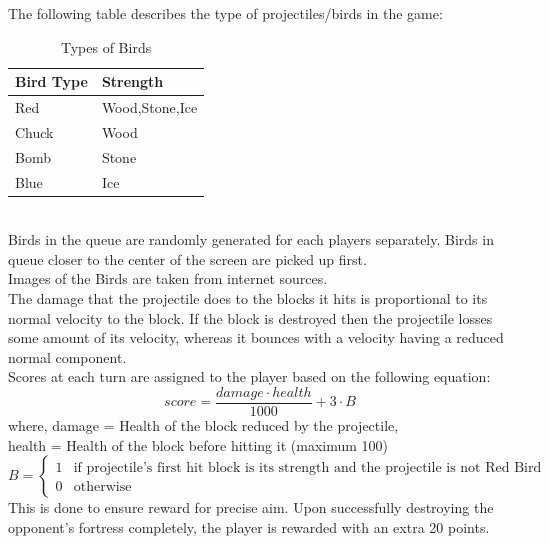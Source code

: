 \documentclass[12pt]{article}
\newcounter{subsubsubsection}[subsubsection]
\begin{document}
The following table describes the type of projectiles/birds in the game:
\begin{table}[h!]
\centering
\label{tab:Birds}
\begin{tabular}{@{}|l|l|@{}}
\toprule
\hline
\textbf{Bird Type} & \textbf{Strength}  \\
\midrule
\hline
Red & Wood,Stone,Ice \\
\hline
Chuck & Wood  \\
\hline
Bomb & Stone \\
\hline
Blue & Ice \\
\hline
\bottomrule
\end{tabular}
\caption{Types of Birds}
\end{table}\\
Birds in the queue are randomly generated for each players separately. Birds in queue closer to the center of the screen are picked up first.\\
Images of the Birds are taken from internet sources.\\

The damage that the projectile does to the blocks it hits is proportional to its normal velocity to the block. If the block is destroyed then the projectile losses some amount of its velocity, whereas it bounces with a velocity having a reduced normal component.\\
Scores at each turn are assigned to the player based on the following equation:
\begin{equation}
    score = \frac{damage\cdot health}{1000} + 3\cdot B
\end{equation}
where, damage = Health of the block reduced by the projectile,\\
       health = Health of the block before hitting it (maximum 100)\\
       \begin{equation*}
       B = 
       \begin{cases}
        1 & \text{if projectile's first hit block is its strength and the projectile is not Red Bird} \\
        0 & \text{otherwise}
       \end{cases}
       \end{equation*}
This is done to ensure reward for precise aim. Upon successfully destroying the opponent's fortress completely, the player is rewarded with an extra 20 points.\\
\end{document}
